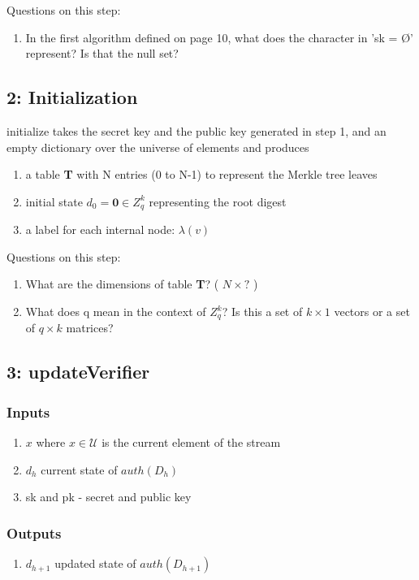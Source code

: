 \documentclass[11pt, letterpaper, oneside]{article}
\begin{document}
Questions on this step:
\begin{enumerate}
\item	 In the first algorithm defined on page 10, what does the character in 'sk =  \O' represent? Is that the null set?
\end{enumerate}

\subsection{ 2: Initialization}
\label{initialize}

initialize takes the secret key and the public key generated in step 1, and an empty dictionary over the universe of elements and produces

\begin{enumerate}
\item a table \textbf{T} with N entries (0 to N-1) to represent the Merkle tree leaves
\item initial state $d_{0} = \textbf{0} \in Z_{q}^{k}$ representing the root digest
\item a label for each internal node: $\lambda(v)$
\end{enumerate}


Questions on this step:
\begin{enumerate}
\item What are the dimensions of table \textbf{T}?  ( $N \times ?$ )
\item What does q mean in the context of $Z_{q}^{k}$?  Is this a set of $k \times 1$ vectors or a set of $q \times k$ matrices?
\end{enumerate}


\subsection{ 3: updateVerifier}
\subsubsection{Inputs}
\begin{enumerate}
\item $x$ where $x \in \mathcal{U}$ is the current element of the stream
\item $d_{h}$ current state of $auth(D_{h})$
\item sk and pk - secret and public key \\
\end{enumerate}

\subsubsection{Outputs}
\begin{enumerate}
\item $d_{h + 1}$ updated state of $auth(D_{h + 1})$
\end{enumerate}
\end{document}

